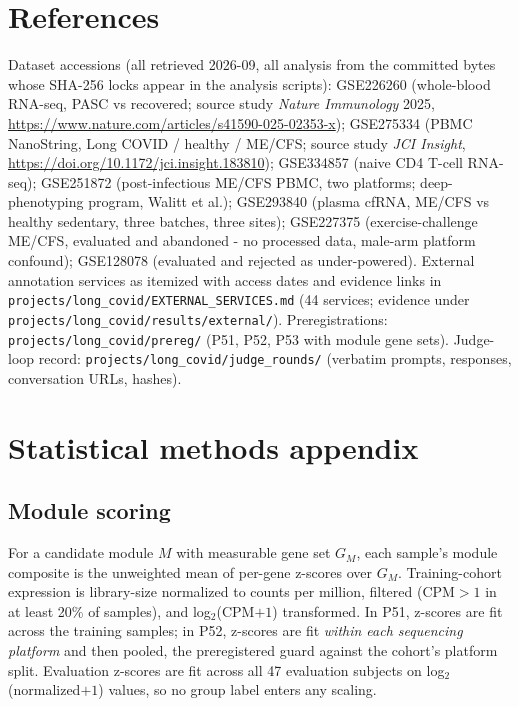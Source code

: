 \documentclass[11pt,a4paper]{article}
\begin{document}
\section{References}
\label{sec:refs}
Dataset accessions (all retrieved 2026-09, all analysis from the committed
bytes whose SHA-256 locks appear in the analysis scripts): GSE226260
(whole-blood RNA-seq, PASC vs recovered; source study \emph{Nature
Immunology} 2025, \url{https://www.nature.com/articles/s41590-025-02353-x});
GSE275334 (PBMC NanoString, Long COVID / healthy / ME/CFS; source study
\emph{JCI Insight}, \url{https://doi.org/10.1172/jci.insight.183810});
GSE334857 (naive CD4 T-cell RNA-seq); GSE251872 (post-infectious ME/CFS
PBMC, two platforms; deep-phenotyping program, Walitt et al.);
GSE293840 (plasma cfRNA, ME/CFS vs healthy sedentary, three batches, three
sites); GSE227375 (exercise-challenge ME/CFS, evaluated and abandoned -
no processed data, male-arm platform confound); GSE128078 (evaluated and
rejected as under-powered). External annotation services as itemized with
access dates and evidence links in
\texttt{projects/long\_covid/EXTERNAL\_SERVICES.md} (44 services;
evidence under \texttt{projects/long\_covid/results/external/}).
Preregistrations: \texttt{projects/long\_covid/prereg/} (P51, P52, P53
with module gene sets). Judge-loop record:
\texttt{projects/long\_covid/judge\_rounds/} (verbatim prompts,
responses, conversation URLs, hashes).

\section{Statistical methods appendix}
\subsection{Module scoring}
For a candidate module $M$ with measurable gene set $G_M$, each sample's
module composite is the unweighted mean of per-gene z-scores over $G_M$.
Training-cohort expression is library-size normalized to counts per million,
filtered (CPM$>1$ in at least 20\% of samples), and log$_2$(CPM$+1$)
transformed. In P51, z-scores are fit across the training samples; in P52,
z-scores are fit \emph{within each sequencing platform} and then pooled, the
preregistered guard against the cohort's platform split. Evaluation z-scores
are fit across all 47 evaluation subjects on log$_2$(normalized$+1$) values,
so no group label enters any scaling.
\end{document}
